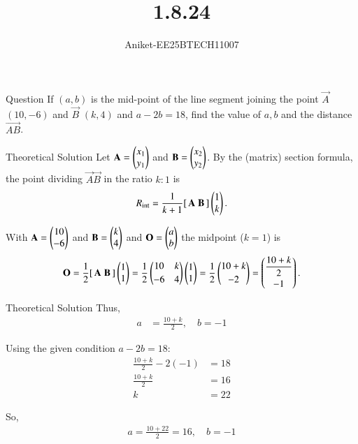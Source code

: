 \documentclass{beamer}
\title %
{1.8.24}
\author %
{Aniket-EE25BTECH11007}
\begin{document}
\frame{\titlepage}

\begin{frame}{Question}
If $(a,b)$ is the mid-point of the line segment joining the point 
$\vec{A}$ $(10,-6)$ and $\vec{B}$ $(k,4)$ and $a-2b=18$, find the value of $a,b$ and the distance $\vec{AB}$.\\
\end{frame}
\begin{frame}{Theoretical Solution}
Let
\(\mathbf{A}=\begin{pmatrix}x_1\\ y_1\end{pmatrix}\) and \(\mathbf{B}=\begin{pmatrix}x_2\\ y_2\end{pmatrix}\).
By the (matrix) section formula, the point dividing \(\vec{A}\vec{B}\) in the ratio \(k:1\) is
\begin{equation}
R_{\text{int}}=\frac{1}{k+1}[\,\mathbf{A}\;\mathbf{B}\,]\begin{pmatrix}1\\ k\end{pmatrix}.
\end{equation}

\medskip

With \(\mathbf{A}=\begin{pmatrix}10\\-6\end{pmatrix}\) and \(\mathbf{B}=\begin{pmatrix}k\\4\end{pmatrix}\) and \(\mathbf{O}=\begin{pmatrix}a\\b\end{pmatrix}\) the midpoint (\(k=1\)) is
\begin{equation}
\mathbf{O}=\frac12[\,\mathbf{A}\;\mathbf{B}\,]\begin{pmatrix}1\\1\end{pmatrix}
=\frac12\begin{pmatrix}10 & k\\[2pt] -6 & 4\end{pmatrix}\begin{pmatrix}1\\1\end{pmatrix}
=\frac12\begin{pmatrix}10+k\\[2pt]-2\end{pmatrix}
=\begin{pmatrix}\dfrac{10+k}{2}\\[6pt]-1\end{pmatrix}.
\end{equation}
\end{frame}
\begin{frame}{Theoretical Solution}
Thus,
\begin{align}
a &= \frac{10+k}{2}, \quad b = -1 \tag{3}
\end{align}

Using the given condition $a - 2b = 18$:
\begin{align}
\frac{10+k}{2} - 2(-1) &= 18 \tag{4}\\
\frac{10+k}{2} &= 16 \tag{5}\\
k &= 22 \tag{6}
\end{align}

So,
\begin{align}
\boxed{a = \frac{10+22}{2} = {16}, \quad b = {-1}} \tag{7}
\end{align}


\end{frame}
\end{document}
